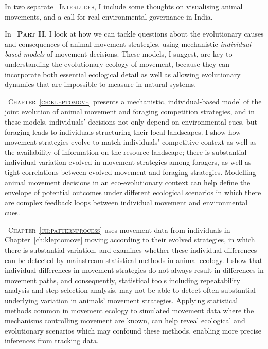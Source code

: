 In two separate {\scshape~Interludes}, I include some thoughts on visualising animal movements, and a call for real environmental governance in India.

\medskip

\noindent In {\scshape~\textbf{Part II}}, I look at how we can tackle questions about the evolutionary causes and consequences of animal movement strategies, using mechanistic \textit{individual-based models} of movement decisions.
These models, I suggest, are key to understanding the evolutionary ecology of movement, because they can incorporate both essential ecological detail as well as allowing evolutionary dynamics that are impossible to measure in natural systems.

\medskip

{\scshape~Chapter~\ref{ch:kleptomove}} presents a mechanistic, individual-based model of the joint evolution of animal movement and foraging competition strategies, and in these models, individuals' decisions not only depend on environmental cues, but foraging leads to individuals structuring their local landscapes.
I show how movement strategies evolve to match individuals' competitive context as well as the availability of information on the resource landscape; there is substantial individual variation evolved in movement strategies among foragers, as well as tight correlations between evolved movement and foraging strategies.
Modelling animal movement decisions in an eco-evolutionary context can help define the envelope of potential outcomes under different ecological scenarios in which there are complex feedback loops between individual movement and environmental cues.

{\scshape~Chapter~\ref{ch:patternprocess}} uses movement data from individuals in Chapter~\ref{ch:kleptomove} moving according to their evolved strategies, in which there is substantial variation, and examines whether these individual differences can be detected by mainstream statistical methods in animal ecology.
I show that individual differences in movement strategies do not always result in differences in movement paths, and consequently, statistical tools including repeatability analysis and step-selection analysis, may not be able to detect often substantial underlying variation in animals' movement strategies.
Applying statistical methods common in movement ecology to simulated movement data where the mechanisms controlling movement are known, can help reveal ecological and evolutionary scenarios which may confound these methods, enabling more precise inferences from tracking data.

